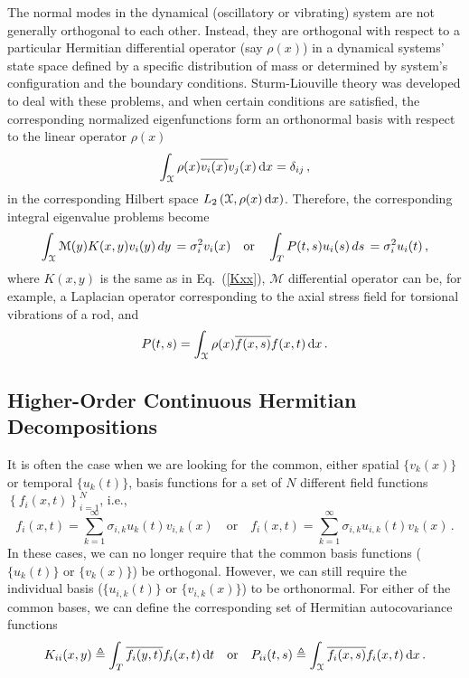 \documentclass[10pt]{article}
\newcommand{\norm}[1]{\left\Vert#1\right\Vert}
\newcommand{\eq}[1]{Eq.\ (\ref{#1})}
\begin{document}
The normal modes in the dynamical (oscillatory or vibrating) system are not generally orthogonal to each other.
Instead, they are orthogonal with respect to a particular Hermitian differential operator (say  $\rho(x)$) in a dynamical systems' state space defined by a specific distribution of mass or determined by system's configuration and the boundary conditions.
Sturm-Liouville theory was developed to deal with these problems, and when certain conditions are satisfied, the corresponding normalized eigenfunctions form an orthonormal basis with respect to the linear operator $\rho(x)$
\begin{equation}
    \int_{\cal X} \rho(x) \overline{v_i(x)} v_j(x)\, \mathrm{d} x = \delta_{ij}\,,
\end{equation}
in the corresponding Hilbert space $L_2\left({\cal X}, \rho(x)\, \mathrm{d}x\right)$.
Therefore, the corresponding integral eigenvalue problems become
\begin{equation}\label{Hred}
    \int_{\cal X} \mathcal{M}(y) K(x,y)  v_i(y)  \, dy \, =\sigma_{i}^2  v_i(x)  \quad \mathrm{or} \quad 
\int_T P(t,s)  u_i(s)  \, ds \, =\sigma_{i}^2  u_i(t)\,,
\end{equation}
where $K(x,y)$ is the same as in \eq{Kxx}, $\mathcal{M}$ differential operator can be, for example, a Laplacian operator corresponding to the axial stress field for torsional vibrations of a rod, and
\begin{equation}
    P(t,s) =     \int_{\cal X}  \rho(x)\overline{f(x,s)}f(x,t) \, \mathrm{d} x \,.
\end{equation}

\subsection{Higher-Order Continuous Hermitian Decompositions}

It is often the case when we are looking for the common, either spatial $\{v_k(x)\}$ or temporal $\{u_k(t)\}$, basis functions for a set of $N$ different field functions $\left\{f_i(x,t)\right\}_{i=1}^N$, i.e.,
\begin{equation}
    f_i(x,t) = \sum_{k=1}^\infty \sigma_{i,k} u_{k}(t) v_{i,k}(x) \quad \mathrm{or} \quad     f_i(x,t) = \sum_{k=1}^\infty \sigma_{i,k} u_{i,k}(t) v_{k}(x)\,.
\end{equation}
In these cases, we can no longer require that the common basis functions ($\{u_k(t)\}$ or $\{v_k(x)\}$) be orthogonal. %
However, we can still require the individual basis ($\{u_{i,k}(t)\}$ or $\{v_{i,k}(x)\}$) to be orthonormal.
For either of the common bases, we can define the corresponding set of Hermitian  autocovariance functions
\begin{equation}\label{Cxy}
    K_{ii}(x,y)\triangleq  %
 \int_T \overline{f_i(y,t)} f_i(x,t)\, \mathrm{d} t
     \quad \mathrm{or}\quad 
     P_{ii}(t,s) 
     \triangleq %
     \int_{\cal X} \overline{f_i(x,s)}f_i(x,t)\, \mathrm{d} x\,.
\end{equation}
\end{document}
